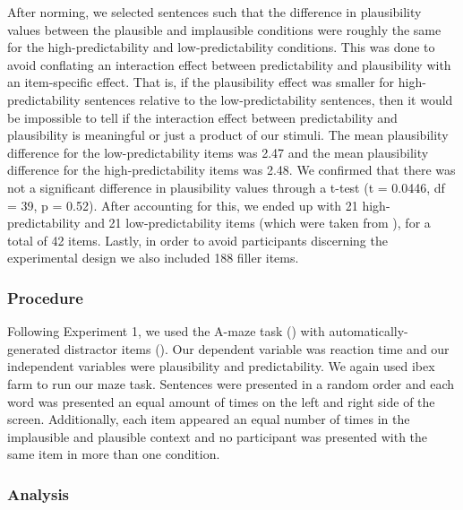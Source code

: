 \documentclass[
  12pt,
  letterpaper,
]{scrreport}
\begin{document}
After norming, we selected sentences such that the difference in
plausibility values between the plausible and implausible conditions
were roughly the same for the high-predictability and low-predictability
conditions. This was done to avoid conflating an interaction effect
between predictability and plausibility with an item-specific effect.
That is, if the plausibility effect was smaller for high-predictability
sentences relative to the low-predictability sentences, then it would be
impossible to tell if the interaction effect between predictability and
plausibility is meaningful or just a product of our stimuli. The mean
plausibility difference for the low-predictability items was 2.47 and
the mean plausibility difference for the high-predictability items was
2.48. We confirmed that there was not a significant difference in
plausibility values through a t-test (t = 0.0446, df = 39, p = 0.52).
After accounting for this, we ended up with 21 high-predictability and
21 low-predictability items (which were taken from
), for
a total of 42 items. Lastly, in order to avoid participants discerning
the experimental design we also included 188 filler items.

\subsubsection{Procedure}\label{procedure-1}

Following Experiment 1, we used the A-maze task
() with
automatically-generated distractor items
(). Our dependent variable was reaction time and our independent
variables were plausibility and predictability. We again used ibex farm
to run our maze task. Sentences were presented in a random order and
each word was presented an equal amount of times on the left and right
side of the screen. Additionally, each item appeared an equal number of
times in the implausible and plausible context and no participant was
presented with the same item in more than one condition.

\subsubsection{Analysis}\label{analysis-1}
\end{document}
